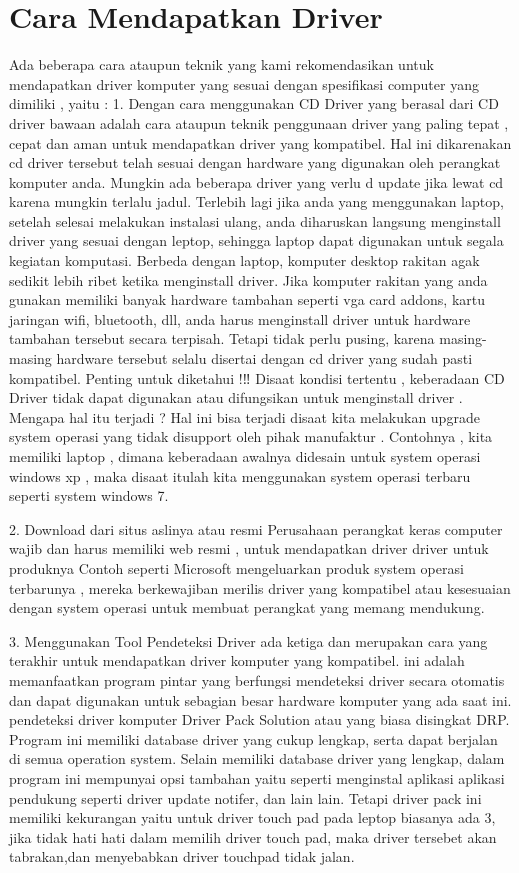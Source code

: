 \section {Cara Mendapatkan Driver}
Ada beberapa cara ataupun teknik yang kami rekomendasikan untuk mendapatkan driver komputer yang sesuai dengan spesifikasi computer yang dimiliki , yaitu :
1.	Dengan cara menggunakan CD 
Driver yang berasal dari CD driver bawaan adalah cara ataupun teknik penggunaan driver yang paling tepat , cepat dan aman untuk mendapatkan driver yang kompatibel.
Hal ini dikarenakan cd driver tersebut telah sesuai dengan hardware yang digunakan oleh perangkat komputer anda. 
Mungkin ada beberapa driver yang verlu d update jika lewat cd karena mungkin terlalu jadul.
Terlebih lagi jika anda yang menggunakan laptop, setelah selesai melakukan instalasi ulang, anda diharuskan langsung menginstall driver yang sesuai dengan leptop, sehingga laptop dapat digunakan untuk segala kegiatan komputasi.
Berbeda dengan laptop, komputer desktop rakitan agak sedikit lebih ribet ketika menginstall driver.
Jika komputer rakitan yang anda gunakan memiliki banyak hardware tambahan seperti vga card addons, kartu jaringan wifi, bluetooth, dll, anda harus menginstall driver untuk hardware tambahan tersebut secara terpisah.
Tetapi tidak perlu pusing, karena masing-masing hardware tersebut selalu disertai dengan cd driver yang sudah pasti kompatibel.
Penting untuk diketahui !‼
Disaat kondisi tertentu  , keberadaan CD Driver tidak dapat digunakan atau difungsikan untuk menginstall driver . Mengapa hal itu terjadi ? Hal ini bisa terjadi disaat kita melakukan upgrade system operasi yang tidak disupport oleh pihak manufaktur . Contohnya , kita memiliki laptop , dimana keberadaan awalnya didesain untuk system operasi windows xp , maka disaat itulah kita menggunakan system operasi terbaru seperti system windows 7.

2. Download dari situs aslinya atau resmi
Perusahaan perangkat keras computer wajib dan harus memiliki web resmi , untuk mendapatkan driver driver untuk produknya
Contoh seperti Microsoft mengeluarkan produk system operasi terbarunya , mereka berkewajiban merilis driver yang kompatibel atau kesesuaian dengan system operasi untuk membuat perangkat yang memang mendukung.

3. Menggunakan Tool Pendeteksi Driver
ada ketiga dan merupakan cara yang terakhir untuk mendapatkan driver komputer yang kompatibel.
ini adalah memanfaatkan program pintar yang berfungsi mendeteksi driver secara otomatis dan dapat digunakan untuk sebagian besar hardware komputer yang ada saat ini.
pendeteksi driver komputer  Driver Pack Solution atau yang biasa disingkat DRP.
Program ini memiliki database driver yang cukup lengkap, serta dapat berjalan di semua operation system.
Selain memiliki database driver yang lengkap, dalam program ini mempunyai opsi tambahan yaitu seperti menginstal aplikasi aplikasi pendukung seperti driver update notifer, dan lain lain.
Tetapi driver pack ini memiliki kekurangan yaitu untuk driver touch pad pada leptop biasanya ada 3, jika tidak hati hati dalam memilih driver touch pad, maka driver tersebet akan tabrakan,dan menyebabkan driver touchpad tidak jalan.

